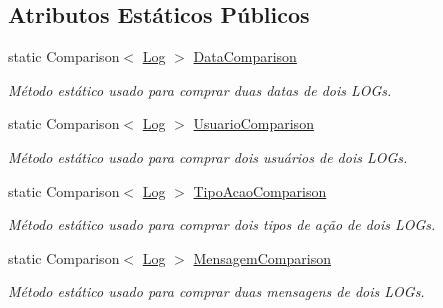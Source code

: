 \subsection*{Atributos Estáticos Públicos}
\begin{DoxyCompactItemize}
\item 
static Comparison$<$ \hyperlink{class_sistema_r_h_1_1_log}{Log} $>$ \hyperlink{class_sistema_r_h_1_1_log_a0a57e152a8d61d7df6fe897d9843fce0}{DataComparison}
\begin{DoxyCompactList}\small\item\em Método estático usado para comprar duas datas de dois LOGs. \item\end{DoxyCompactList}\item 
static Comparison$<$ \hyperlink{class_sistema_r_h_1_1_log}{Log} $>$ \hyperlink{class_sistema_r_h_1_1_log_a56bcfc31cd67e8bc471cdb1c39b95625}{UsuarioComparison}
\begin{DoxyCompactList}\small\item\em Método estático usado para comprar dois usuários de dois LOGs. \item\end{DoxyCompactList}\item 
static Comparison$<$ \hyperlink{class_sistema_r_h_1_1_log}{Log} $>$ \hyperlink{class_sistema_r_h_1_1_log_a46bedfe624dbeecabcdf8750d71d8503}{TipoAcaoComparison}
\begin{DoxyCompactList}\small\item\em Método estático usado para comprar dois tipos de ação de dois LOGs. \item\end{DoxyCompactList}\item 
static Comparison$<$ \hyperlink{class_sistema_r_h_1_1_log}{Log} $>$ \hyperlink{class_sistema_r_h_1_1_log_a51daea04f14453613b4a9b0d68f5679e}{MensagemComparison}
\begin{DoxyCompactList}\small\item\em Método estático usado para comprar duas mensagens de dois LOGs. \item\end{DoxyCompactList}\end{DoxyCompactItemize}
